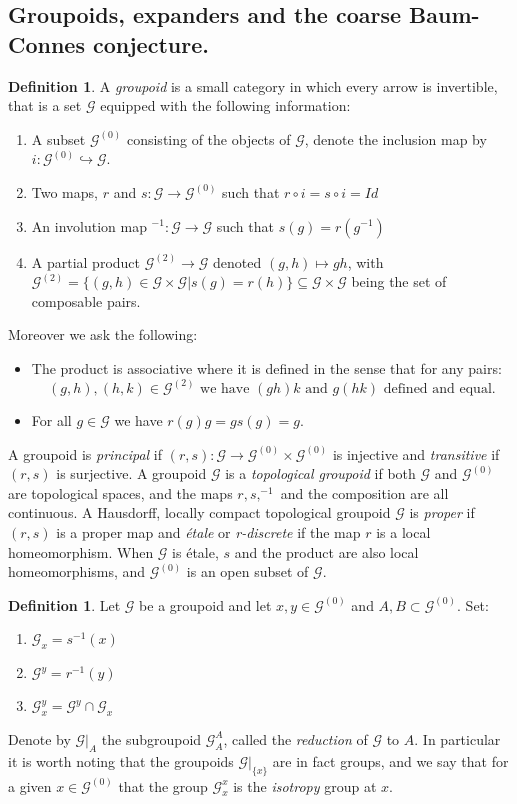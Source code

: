 \documentclass[11pt]{amsart}
\theoremstyle{plain}
\theoremstyle{definition}%
\newtheorem{definition}[theorem]{Definition}%
\theoremstyle{remark}%
\newcommand{\G}{\mathcal{G}}
\begin{document}
\subsection{Groupoids, expanders and the coarse Baum-Connes conjecture.}\label{Sect:GO}
\begin{definition}\label{def:grpoid2} A \textit{groupoid} is a small category in which every arrow is invertible, that is a set $\G$ equipped with the following information:
\begin{enumerate}
\item A subset $\G^{(0)}$ consisting of the objects of $\G$, denote the inclusion map by $i: \G^{(0)}\hookrightarrow \G$. 
\item Two maps, $r$ and $s: \G  \rightarrow \G^{(0)}$ such that $r\circ i = s \circ i = Id$ 
\item An involution map $^{-1}:\G \rightarrow \G$ such that $s(g)=r(g^{-1})$
\item A partial product $\G^{(2)} \rightarrow \G$ denoted $(g,h) \mapsto gh$, with $\G^{(2)}=\lbrace (g,h) \in \G \times \G | s(g)=r(h) \rbrace\subseteq \G\times \G$ being the set of composable pairs.
\end{enumerate}
Moreover we ask the following:
\begin{itemize}
\item The product is associative where it is defined in the sense that for any pairs: 
\begin{equation*}
(g,h),(h,k)\in \G^{(2)} \mbox{ we have }(gh)k \mbox{ and } g(hk) \mbox{ defined and equal}.
\end{equation*}
\item For all $g \in \G$ we have $r(g)g=gs(g)=g$.
\end{itemize}
\end{definition}
A groupoid is \textit{principal} if $(r,s): \G \rightarrow \G^{(0)} \times \G^{(0)}$ is injective and \textit{transitive} if $(r,s)$ is surjective. A groupoid $\G$ is a \textit{topological groupoid} if both $\G$ and $\G^{(0)}$ are topological spaces, and the maps $r,s, ^{-1}$ and the composition are all continuous. A Hausdorff, locally compact topological groupoid $\G$ is \textit{proper} if $(r,s)$ is a proper map and \textit{\'etale} or \textit{r-discrete} if the map $r$ is a local homeomorphism. When $\G$ is \'etale, $s$ and the product are also local homeomorphisms, and $\G^{(0)}$ is an open subset of $\G$.

\begin{definition}
Let $\G$ be a groupoid and let $x,y \in \G^{(0)}$ and $A,B \subset \G^{(0)}$. Set:
\begin{enumerate}
\item $\G_{x}=s^{-1}(x)$
\item $\G^{y}=r^{-1}(y)$
\item $\G^{y}_{x}=\G^{y} \cap \G_{x}$
\end{enumerate}
Denote by $\G|_{A}$ the subgroupoid $\G_{A}^{A}$, called the \textit{reduction} of $\G$ to $A$. In particular it is worth noting that the groupoids $\G|_{\lbrace x \rbrace}$ are in fact groups, and we say that for a given $x \in \G^{(0)}$ that the group $\G^{x}_{x}$ is the \textit{isotropy} group at $x$.
\end{definition}
\end{document}
